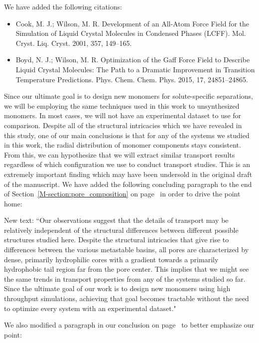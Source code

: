 \documentclass{article}
\begin{document}
\begin{enumerate}
    We have added the following citations:
    \begin{itemize}
    \item Cook, M. J.; Wilson, M. R. Development of an All-Atom Force Field for the Simulation
    of Liquid Crystal Molecules in Condensed Phases (LCFF). Mol. Cryst. Liq. Cryst.
    2001, 357, 149–165.
    \item Boyd, N. J.; Wilson, M. R. Optimization of the Gaff Force Field to Describe Liquid
    Crystal Molecules: The Path to a Dramatic Improvement in Transition Temperature
    Predictions. Phys. Chem. Chem. Phys. 2015, 17, 24851–24865.
    \end{itemize}

    Since our ultimate goal is to design new monomers for solute-specific
    separations, we will be employing the same techniques used in this work to
    unsynthesized monomers. In most cases, we will not have an experimental dataset
    to use for comparison. Despite all of the structural intricacies which we have
    revealed in this study, one of our main conclusions is that for any of the 
    systems we studied in this work, the radial distribution of monomer components
    stays consistent. From this, we can hypothesize that we will extract similar
    transport results regardless of which configuration we use to conduct
    transport studies. This is an extremely important finding which may have
    been undersold in the original draft of the manuscript. We have added the
    following concluding paragraph to the end of
    Section~\ref{M-section:pore_composition} on
    page~\pageref{M-addition:pore_composition} in order to drive the point home:

    New text: ``Our observations suggest that the details of transport may be
    relatively independent of the structural differences between different possible
    structures studied here. Despite the structural intricacies that give rise to
    differences between the various metastable basins, all pores are characterized
    by dense, primarily hydrophilic cores with a gradient towards a primarily
    hydrophobic tail region far from the pore center. This implies that we might
    see the same trends in transport properties from any of the systems studied so
    far. Since the ultimate goal of our work is to design new monomers using high
    throughput simulations, achieving that goal becomes tractable without the need
    to optimize every system with an experimental dataset."
	
    We also modified a paragraph in our conclusion on page~\pageref{M-rework:conclusion}
    to better emphasize our point:


\end{enumerate}
\end{document}
